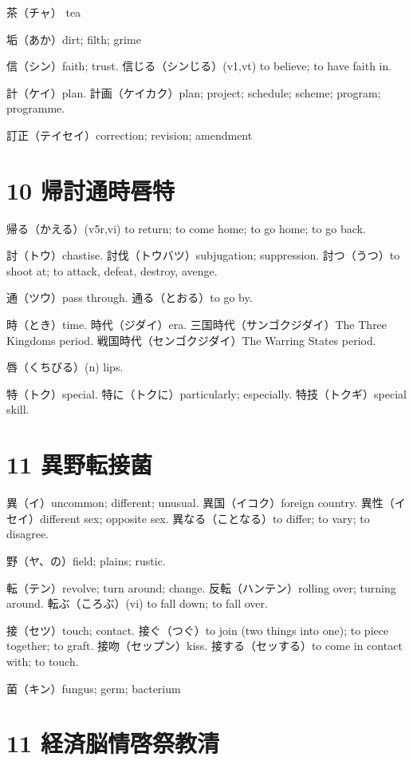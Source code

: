 茶（チャ） tea

垢（あか）dirt; filth; grime

信（シン）faith; trust.
信じる（シンじる）(v1,vt) to believe; to have faith in.

計（ケイ）plan.
計画（ケイカク）plan; project; schedule; scheme; program; programme.

訂正（テイセイ）correction; revision; amendment

\section{10 帰討通時唇特}

帰る（かえる）(v5r,vi)
to return; to come home; to go home; to go back.

討（トウ）chastise.
討伐（トウバツ）subjugation; suppression.
討つ（うつ）to shoot at; to attack, defeat, destroy, avenge.

通（ツウ）pass through.
通る（とおる）to go by.

時（とき）time.
時代（ジダイ）era.
三国時代（サンゴクジダイ）The Three Kingdoms period.
戦国時代（センゴクジダイ）The Warring States period.

唇（くちびる）(n) lips.

特（トク）special.
特に（トクに）particularly; especially.
特技（トクギ）special skill.

\section{11 異野転接菌}

異（イ）uncommon; different; unusual.
異国（イコク）foreign country.
異性（イセイ）different sex; opposite sex.
異なる（ことなる）to differ; to vary; to disagree.

野（ヤ、の）field; plains; rustic.

転（テン）revolve; turn around; change.
反転（ハンテン）rolling over; turning around.
転ぶ（ころぶ）(vi) to fall down; to fall over.

接（セツ）touch; contact.
接ぐ（つぐ）to join (two things into one); to piece together; to graft.
接吻（セップン）kiss.
接する（セッする）to come in contact with; to touch.

菌（キン）fungus; germ; bacterium

\section{11 経済脳情啓祭教清}

